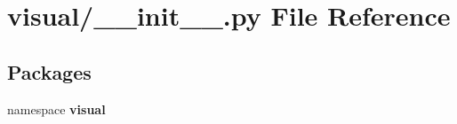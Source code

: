 \section{visual/\-\_\-\-\_\-init\-\_\-\-\_\-.py \-File \-Reference}
\label{visual_2____init_____8py}
\subsection*{\-Packages}
\begin{DoxyCompactItemize}
\item 
namespace {\bf visual}
\end{DoxyCompactItemize}
